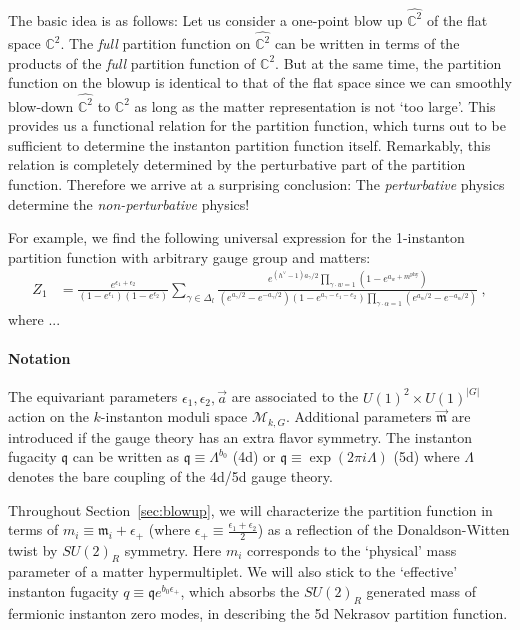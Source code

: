 \documentclass[letterpaper, 11pt]{article}
\def\IC{\mathbb{C}}
\def\a{\alpha}
\def\g{\gamma}
\def\e{\epsilon}
\begin{document}
The basic idea is as follows: Let us consider a one-point blow up $\hat{\IC^2}$ of the flat space $\IC^2$. The \emph{full} partition function on $\hat{\IC^2}$ can be written in terms of the products of the \emph{full} partition function of $\IC^2$. But at the same time, the partition function on the blowup is identical to that of the flat space since we can smoothly blow-down $\hat{\IC^2}$ to $\IC^2$ as long as the matter representation is not `too large'. This provides us a functional relation for the partition function, which turns out to be sufficient to determine the instanton partition function itself. Remarkably, this relation is completely determined by the perturbative part of the partition function. Therefore we arrive at a surprising conclusion: The \emph{perturbative} physics determine the \emph{non-perturbative} physics! 

For example, we find the following universal expression for the 1-instanton partition function with arbitrary gauge group and matters:
\begin{align}
Z_1 &= \frac{e^{\e_1+\e_2} }{(1-e^{\e_1})(1-e^{\e_2})} \sum_{\g \in \Delta_l} \frac{e^{(h^\vee -1)a_\g/2} \prod_{\g \cdot w = 1} (1-e^{a_w + m^{\textrm{phy} }}) }{ (e^{a_\g/2} - e^{-a_\g/2})(1-e^{a_\g-\e_1-e_2}) {\prod_{\g \cdot \a = 1} (e^{a_\a/2}-e^{-a_\a/2 })} } \ , 
\end{align}
where ...


\paragraph{Notation}
The equivariant parameters $\epsilon_{1}, \epsilon_2, \vec{a}$ are associated to the $U(1)^2 \times U(1)^{|G|}$ action on the $k$-instanton moduli space $\mathcal{M}_{k,G}$. Additional parameters $\vec{\mathfrak{m}}$ are introduced if the gauge theory has an extra  flavor symmetry. The instanton fugacity $\mathfrak{q}$ can be written as $\mathfrak{q}\equiv\Lambda^{b_0}$ (4d) or $\mathfrak{q}\equiv \exp(2\pi i \Lambda)$ (5d) where $\Lambda$ denotes the bare coupling of the 4d/5d gauge theory.

Throughout Section~\ref{sec:blowup}, we will characterize the partition function in terms of $m_i \equiv \mathfrak{m}_i + \epsilon_+$ (where $\epsilon_+ \equiv \frac{\epsilon_1 + \epsilon_2}{2}$) as a reflection of the Donaldson-Witten twist by $SU(2)_R$ symmetry. Here $m_i$ corresponds to the `physical' mass parameter of a matter hypermultiplet. We will also stick to the `effective' instanton fugacity $q \equiv \mathfrak{q} e^{{b_0}\epsilon_+}$, which absorbs the $SU(2)_R$ generated mass of fermionic instanton zero modes, in describing the 5d Nekrasov partition function.
\end{document}
